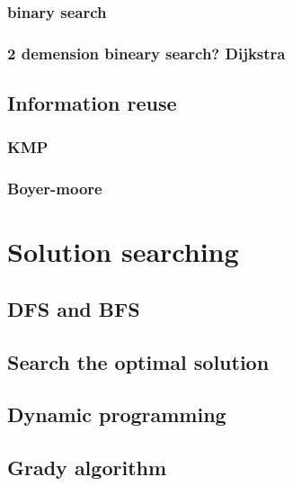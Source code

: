 \documentclass{article}
\begin{document}

\subsubsection{binary search}

\subsubsection{2 demension bineary search? Dijkstra}

\subsection{Information reuse}

\subsubsection{KMP}

\subsubsection{Boyer-moore}

\section{Solution searching}
\subsection{DFS and BFS}

\subsection{Search the optimal solution}

\subsection{Dynamic programming}

\subsection{Grady algorithm}
\end{document}
